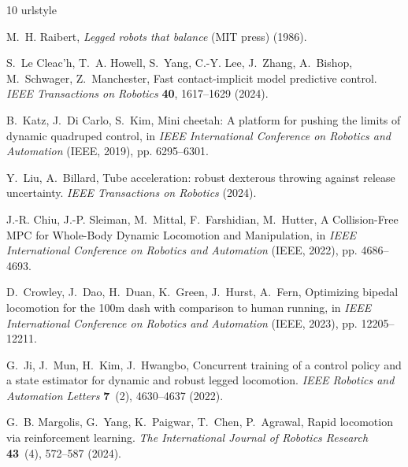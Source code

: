 \documentclass[9pt,twocolumn,twoside]{osajnl}
\begin{document}
\begin{thebibliography}{10}
    \providecommand{\url}[1]{\texttt{#1}}
    \expandafter\ifx\csname urlstyle\endcsname\relax
      \providecommand{\doi}[1]{doi:\discretionary{}{}{}#1}\else
      \providecommand{\doi}{doi:\discretionary{}{}{}\begingroup
      \urlstyle{rm}\Url}\fi
    
    M.~H. {Raibert}, \emph{Legged robots that balance} (MIT press) (1986).
    
    S.~{Le Cleac'h}, T.~A. {Howell}, S.~{Yang}, C.-Y. {Lee}, J.~{Zhang},
      A.~{Bishop}, M.~{Schwager}, Z.~{Manchester}, Fast contact-implicit model
      predictive control. \emph{IEEE Transactions on Robotics} \textbf{40},
      1617--1629 (2024).
    
    B.~{Katz}, J.~{Di Carlo}, S.~{Kim}, Mini cheetah: A platform for pushing the
      limits of dynamic quadruped control, in \emph{IEEE International Conference
      on Robotics and Automation} (IEEE, 2019), pp. 6295--6301.
    
    Y.~{Liu}, A.~{Billard}, Tube acceleration: robust dexterous throwing against
      release uncertainty. \emph{IEEE Transactions on Robotics}  (2024).
    
    J.-R. {Chiu}, J.-P. {Sleiman}, M.~{Mittal}, F.~{Farshidian}, M.~{Hutter}, A
      Collision-Free MPC for Whole-Body Dynamic Locomotion and Manipulation, in
      \emph{IEEE International Conference on Robotics and Automation} (IEEE, 2022),
      pp. 4686--4693.
    
    D.~{Crowley}, J.~{Dao}, H.~{Duan}, K.~{Green}, J.~{Hurst}, A.~{Fern},
      Optimizing bipedal locomotion for the 100m dash with comparison to human
      running, in \emph{IEEE International Conference on Robotics and Automation}
      (IEEE, 2023), pp. 12205--12211.
    
    G.~{Ji}, J.~{Mun}, H.~{Kim}, J.~{Hwangbo}, Concurrent training of a control
      policy and a state estimator for dynamic and robust legged locomotion.
      \emph{IEEE Robotics and Automation Letters} \textbf{7}~(2), 4630--4637
      (2022).
    
    G.~B. {Margolis}, G.~{Yang}, K.~{Paigwar}, T.~{Chen}, P.~{Agrawal}, Rapid
      locomotion via reinforcement learning. \emph{The International Journal of
      Robotics Research} \textbf{43}~(4), 572--587 (2024).
    

\end{thebibliography}
\end{document}

